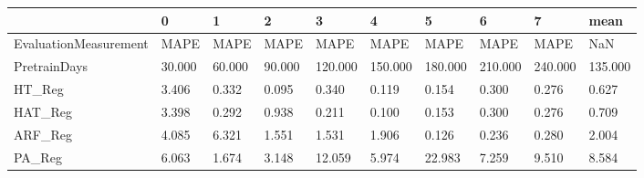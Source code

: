 \begin{tabular}{llllllllll}
\toprule
{} &      0 &      1 &      2 &       3 &       4 &       5 &       6 &       7 &    mean \\
\midrule
EvaluationMeasurement &   MAPE &   MAPE &   MAPE &    MAPE &    MAPE &    MAPE &    MAPE &    MAPE &     NaN \\
PretrainDays          & 30.000 & 60.000 & 90.000 & 120.000 & 150.000 & 180.000 & 210.000 & 240.000 & 135.000 \\
HT\_Reg                &  3.406 &  0.332 &  0.095 &   0.340 &   0.119 &   0.154 &   0.300 &   0.276 &   0.627 \\
HAT\_Reg               &  3.398 &  0.292 &  0.938 &   0.211 &   0.100 &   0.153 &   0.300 &   0.276 &   0.709 \\
ARF\_Reg               &  4.085 &  6.321 &  1.551 &   1.531 &   1.906 &   0.126 &   0.236 &   0.280 &   2.004 \\
PA\_Reg                &  6.063 &  1.674 &  3.148 &  12.059 &   5.974 &  22.983 &   7.259 &   9.510 &   8.584 \\
\bottomrule
\end{tabular}
